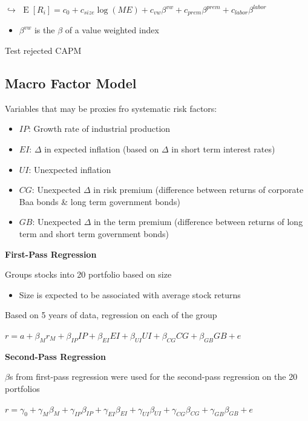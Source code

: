 \documentclass[]{book}
\providecommand{\tightlist}{%
  \setlength{\itemsep}{0pt}\setlength{\parskip}{0pt}}
\theoremstyle{definition}
\theoremstyle{definition}
\theoremstyle{remark}
\begin{document}
\(\hookrightarrow\)
\(\operatorname{E}[R_i] = c_0 + c_{size} \operatorname{log}(ME) + c_{vw}\beta^{vw} + c_{prem}\beta^{prem} + c_{labor}\beta^{labor}\)

\begin{itemize}
\tightlist
\item
  \(\beta^{vw}\) is the \(\beta\) of a value weighted index
\end{itemize}

Test rejected CAPM

\subsection{Macro Factor Model}\label{macro-factor-model}

Variables that may be proxies fro systematic risk factors:

\begin{itemize}
\item
  \(IP\): Growth rate of industrial production
\item
  \(EI\): \(\Delta\) in expected inflation (based on \(\Delta\) in short
  term interest rates)
\item
  \(UI\): Unexpected inflation
\item
  \(CG\): Unexpected \(\Delta\) in risk premium (difference between
  returns of corporate Baa bonds \& long term government bonds)
\item
  \(GB\): Unexpected \(\Delta\) in the term premium (difference between
  returns of long term and short term government bonds)
\end{itemize}

\textbf{First-Pass Regression}

Groups stocks into 20 portfolio based on size

\begin{itemize}
\tightlist
\item
  Size is expected to be associated with average stock returns
\end{itemize}

Based on 5 years of data, regression on each of the group

\(r = a + \beta_M r_M + \beta_{IP} IP + \beta_{EI} EI + \beta_{UI} UI +\beta_{CG} CG + \beta_{GB} GB + e\)

\textbf{Second-Pass Regression}

\(\beta\)s from first-pass regression were used for the second-pass
regression on the 20 portfolios

\(r = \gamma_0 + \gamma_M \beta_M + \gamma_{IP} \beta_{IP} + \gamma_{EI} \beta_{EI} + \gamma_{UI} \beta_{UI} +\gamma_{CG} \beta_{CG} + \gamma_{GB} \beta_{GB} + e\)
\end{document}
